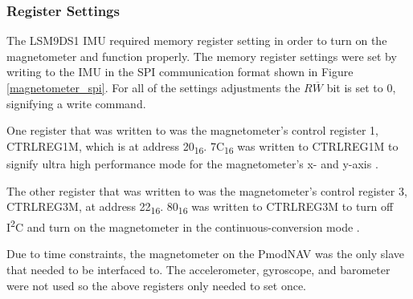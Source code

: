 \subsubsection{Register Settings} \label{imu_settings}
The LSM9DS1 IMU required memory register setting in order to turn on the magnetometer and function properly. The memory register settings were set by writing to the IMU in the SPI communication format shown in Figure \ref{magnetometer_spi}. For all of the settings adjustments the $R\overline{W}$ bit is set to 0, signifying a write command.
\par
One register that was written to was the magnetometer's control register 1, CTRL\textunderscore{}REG\textunderscore{}1\textunderscore{}M, which is at address 20\textsubscript{16}. 7C\textsubscript{16} was written to CTRL\textunderscore{}REG\textunderscore{}1\textunderscore{}M to signify ultra high performance mode for the magnetometer's x- and y-axis \cite{lsm9ds1}.
\par
The other register that was written to was the magnetometer's control register 3, CTRL\textunderscore{}REG\textunderscore{}3\textunderscore{}M, at address 22\textsubscript{16}. 80\textsubscript{16} was written to CTRL\textunderscore{}REG\textunderscore{}3\textunderscore{}M to turn off I\textsuperscript{2}C and turn on the magnetometer in the continuous-conversion mode \cite{lsm9ds1}.
\par
Due to time constraints, the magnetometer on the PmodNAV was the only slave that needed to be interfaced to. The accelerometer, gyroscope, and barometer were not used so the above registers only needed to set once.

